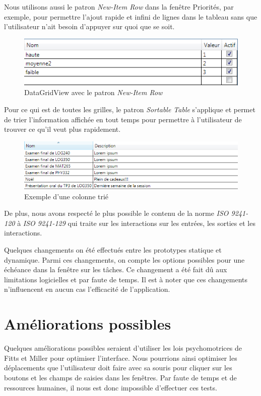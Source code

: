 \documentclass[letterpaper, oneside, 12pt, these, creativecommons]{thETS}
\begin{document}
Nous utilisons aussi le patron \emph{New-Item Row} dans la fenêtre Priorités, par exemple, pour permettre l'ajout rapide et infini de lignes dans le tableau sans que l'utilisateur n'ait besoin d'appuyer sur quoi que se soit. 

\begin{figure}[H!]
	\centering
	\includegraphics[width=1\textwidth]{new_item_row.png}
	\caption{DataGridView avec le patron \emph{New-Item Row}}
\end{figure}

Pour ce qui est de toutes les grilles, le patron \emph{Sortable Table} s'applique et permet de trier l'information affichée en tout temps pour permettre à l'utilisateur de trouver ce qu'il veut plus rapidement.

\begin{figure}[H!]
	\centering
	\includegraphics[width=1\textwidth]{sortable_table.png}
	\caption{Exemple d'une colonne trié}
\end{figure}

De plus, nous avons respecté le plus possible le contenu de la norme \emph{ISO 9241-120} à \emph{ISO 9241-129} qui traite sur les interactions sur les entrées, les sorties et les interactions.

Quelques changements on été effectués entre les prototypes statique et dynamique. Parmi ces changements, on compte les options possibles pour une échéance dans la fenêtre sur les tâches. Ce changement a été fait dû aux limitations logicielles et par faute de temps. Il est à noter que ces changements n'influencent en aucun cas l'efficacité de l'application.

\section{Améliorations possibles}

Quelques améliorations possibles seraient d'utiliser les lois psychomotrices de Fitts et Miller pour optimiser l'interface. Nous pourrions ainsi optimiser les déplacements que l'utilisateur doit faire avec sa souris pour cliquer sur les boutons et les champs de saisies dans les fenêtres. Par faute de temps et de ressources humaines, il nous est donc impossible d'effectuer ces tests.
\end{document}
